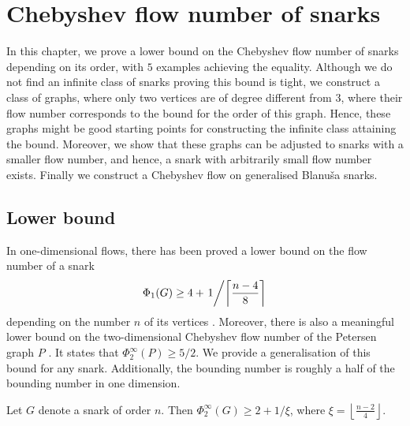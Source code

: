 \chapter{Chebyshev flow number of snarks} %
\label{ch:bounds}

In this chapter, we prove a lower bound on the Chebyshev flow number of snarks depending on its order, with $5$ examples achieving the equality. Although we do not find an infinite class of snarks proving this bound is tight,  we construct a class of graphs, where only two vertices are of degree different from $3$, where their flow number corresponds to the bound for the order of this graph. Hence, these graphs might be good starting points for constructing the infinite class attaining the bound. Moreover, we show that these graphs can be adjusted to snarks with a smaller flow number, and hence, a snark with arbitrarily small flow number exists. Finally we construct a Chebyshev flow on generalised Blanuša snarks.

\section{Lower bound}

In one-dimensional flows, there has been proved a lower bound on the flow number of a snark 
\begin{equation*}
	\Phi_1(G) \geq 4 + \left.1\middle/\left\lceil\frac{n-4}{8}\right\rceil\right.
\end{equation*}
depending on the number $n$ of its vertices \cite[p. 14]{cycle_rank}. Moreover, there is also a meaningful lower bound on the two-dimensional Chebyshev flow number of the Petersen graph $P$ \cite[p. 99]{gloria_phd}. It states that $\Phi_2^\infty(P)\geq 5/2$. We provide a generalisation of this bound for any snark. Additionally, the bounding number is roughly a half of the bounding number in one dimension.

\begin{proposition} \emph{\cite[pp. 15, 16]{preprint}}
	Let $G$ denote a snark of order $n$. Then $\Phi_2^{\infty}(G) \geq 2+1 / \xi$, where $\xi=\left\lfloor\frac{n-2}{4}\right\rfloor$. \label{prop:lower_bound}
\end{proposition}

